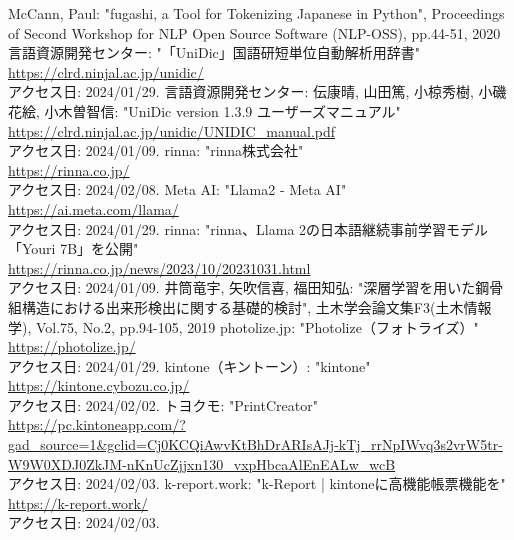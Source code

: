 \documentclass[uplatex, report, a4j, 10pt]{jsbook}
\begin{document}
\begin{thebibliography}{0}
  McCann, Paul: "fugashi, a Tool for Tokenizing Japanese in Python", Proceedings of Second Workshop for NLP Open Source Software (NLP-OSS), pp.44-51, 2020
  言語資源開発センター: "「UniDic」国語研短単位自動解析用辞書"\\\url{https://clrd.ninjal.ac.jp/unidic/}\\アクセス日: 2024/01/29.
  言語資源開発センター: 伝康晴, 山田篤, 小椋秀樹, 小磯花絵, 小木曽智信: "UniDic version 1.3.9 ユーザーズマニュアル"\\\url{https://clrd.ninjal.ac.jp/unidic/UNIDIC_manual.pdf}\\アクセス日: 2024/01/09.
  rinna: "rinna株式会社"\\\url{https://rinna.co.jp/}\\アクセス日: 2024/02/08.
  Meta AI: "Llama2 - Meta AI"\\\url{https://ai.meta.com/llama/}\\アクセス日: 2024/01/29.
  rinna: "rinna、Llama 2の日本語継続事前学習モデル「Youri 7B」を公開"\\\url{https://rinna.co.jp/news/2023/10/20231031.html}\\アクセス日: 2024/01/09.
  井筒竜宇, 矢吹信喜, 福田知弘: "深層学習を用いた鋼骨組構造における出来形検出に関する基礎的検討", 土木学会論文集F3(土木情報学), Vol.75, No.2, pp.94-105, 2019
  photolize.jp: "Photolize（フォトライズ）"\\\url{https://photolize.jp/}\\アクセス日: 2024/01/29.
  kintone（キントーン）: "kintone"\\\url{https://kintone.cybozu.co.jp/}\\アクセス日: 2024/02/02.
  トヨクモ: "PrintCreator"\\\url{https://pc.kintoneapp.com/?gad_source=1&gclid=Cj0KCQiAwvKtBhDrARIsAJj-kTj_rrNpIWvq3s2vrW5tr-W9W0XDJ0ZkJM-nKnUcZjjxn130_vxpHbcaAlEnEALw_wcB}\\アクセス日: 2024/02/03.
  k-report.work: "k-Report | kintoneに高機能帳票機能を"\\\url{https://k-report.work/}\\アクセス日: 2024/02/03.
\end{thebibliography}

\end{document}
